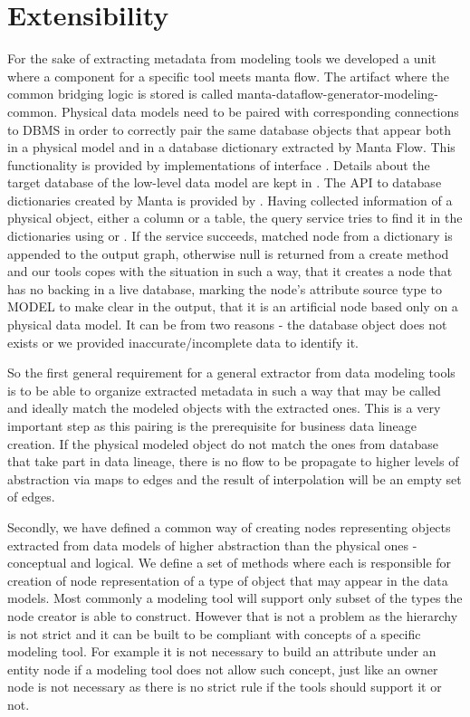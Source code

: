 \section{Extensibility}

For the sake of extracting metadata from modeling tools we developed a unit where a component for a specific tool meets manta flow.
The artifact where the common bridging logic is stored is called manta-dataflow-generator-modeling-common.
Physical data models need to be paired with corresponding connections to DBMS in order to correctly pair the same database objects that appear both in a physical model and in a database dictionary extracted by Manta Flow. This functionality is provided by implementations of interface . Details about the target database of the low-level data model are kept in . The API to database dictionaries created by Manta is provided by . 
Having collected information of a physical object, either a column or a table, the query service tries to find it in the dictionaries using  or . 
If the service succeeds, matched node from a dictionary is appended to the output graph, otherwise null is returned from a create method and our tools copes with the situation in such a way, that it creates a node that has no backing in a live database, marking the node's attribute source type to MODEL to make clear in the output, that it is an artificial node based only on a physical data model. It can be from two reasons - the database object does not exists or we provided inaccurate/incomplete data to identify it.

So the first general requirement for a general extractor from data modeling tools is to be able to organize extracted metadata in such a way that  may be called and ideally match the modeled objects with the extracted ones.
This is a very important step as this pairing is the prerequisite for business data lineage creation. If the physical modeled object do not match the ones from database that take part in data lineage, there is no flow to be propagate to higher levels of abstraction via maps to edges and the result of interpolation will be an empty set of edges.

Secondly, we have defined a common way of creating nodes representing objects extracted from data models of higher abstraction than the physical ones - conceptual and logical.
We define a set of methods where each is responsible for creation of node representation of a type of object that may appear in the data models. Most commonly a modeling tool will support only subset of the types the node creator is able to construct. However that is not a problem as the hierarchy is not strict and it can be built to be compliant with concepts of a specific modeling tool. 
For example it is not necessary to build an attribute under an entity node if a modeling tool does not allow such concept, just like an owner node is not necessary as there is no strict rule if the tools should support it or not.

